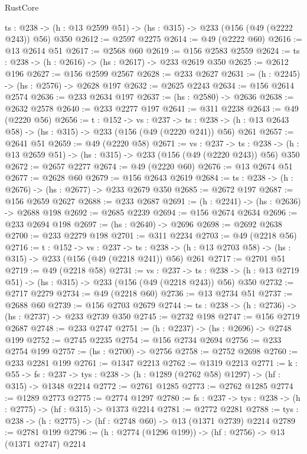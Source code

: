 \begin{lexlean}{RustCore}
\begin{coremodule}
  {ts : @238} -> (h : @13 @2599 @51) -> (hs : @315) -> @233 (@156 (@49 (@2222 @243)) @56) @350
@2612 := @2597 @2275
@2614 := @49 (@2222 @60)
@2616 := @13 @2614 @51
@2617 := @2568 @60
@2619 := @156 @2583 @2559
@2624 := {ts : @238} -> (h : @2616) -> (hs : @2617) -> @233 @2619 @350
@2625 := @2612 @196
@2627 := @156 @2599 @2567
@2628 := @233 @2627
@2631 := (h : @2245) -> (hs : @2576) -> @2628 @197
@2632 := @2625 @2243
@2634 := @156 @2614 @2574
@2636 := @233 @2634 @197
@2637 := (hs : @2580) -> @2636
@2638 := @2632 @2578
@2640 := @233 @2277 @197
@2641 := @311 @2238
@2643 := @49 (@2220 @56)
@2656 := {t : @152} ->
  {vs : @237} ->
  {ts : @238} -> (h : @13 @2643 @58) -> (hs : @315) -> @233 (@156 (@49 (@2220 @241)) @56) @261
@2657 := @2641 @51
@2659 := @49 (@2220 @58)
@2671 := {vs : @237} ->
  {ts : @238} -> (h : @13 @2659 @51) -> (hs : @315) -> @233 (@156 (@49 (@2220 @243)) @56) @350
@2672 := @2657 @2277
@2674 := @49 (@2220 @60)
@2676 := @13 @2674 @51
@2677 := @2628 @60
@2679 := @156 @2643 @2619
@2684 := {ts : @238} -> (h : @2676) -> (hs : @2677) -> @233 @2679 @350
@2685 := @2672 @197
@2687 := @156 @2659 @2627
@2688 := @233 @2687
@2691 := (h : @2241) -> (hs : @2636) -> @2688 @198
@2692 := @2685 @2239
@2694 := @156 @2674 @2634
@2696 := @233 @2694 @198
@2697 := (hs : @2640) -> @2696
@2698 := @2692 @2638
@2700 := @233 @2279 @198
@2701 := @311 @2234
@2703 := @49 (@2218 @56)
@2716 := {t : @152} ->
  {vs : @237} ->
  {ts : @238} -> (h : @13 @2703 @58) -> (hs : @315) -> @233 (@156 (@49 (@2218 @241)) @56) @261
@2717 := @2701 @51
@2719 := @49 (@2218 @58)
@2731 := {vs : @237} ->
  {ts : @238} -> (h : @13 @2719 @51) -> (hs : @315) -> @233 (@156 (@49 (@2218 @243)) @56) @350
@2732 := @2717 @2279
@2734 := @49 (@2218 @60)
@2736 := @13 @2734 @51
@2737 := @2688 @60
@2739 := @156 @2703 @2679
@2744 := {ts : @238} -> (h : @2736) -> (hs : @2737) -> @233 @2739 @350
@2745 := @2732 @198
@2747 := @156 @2719 @2687
@2748 := @233 @2747
@2751 := (h : @2237) -> (hs : @2696) -> @2748 @199
@2752 := @2745 @2235
@2754 := @156 @2734 @2694
@2756 := @233 @2754 @199
@2757 := (hs : @2700) -> @2756
@2758 := @2752 @2698
@2760 := @233 @2281 @199
@2761 := @1347 @2213
@2762 := @1319 @2213
@2771 := {k : @55} ->
  {fs : @237} -> {tys : @238} -> (h : @1289 (@2762 @58) @1297) -> (hf : @315) -> @1348 @2214
@2772 := @2761 @1285
@2773 := @2762 @1285
@2774 := @1289 @2773
@2775 := @2774 @1297
@2780 := {fs : @237} -> {tys : @238} -> (h : @2775) -> (hf : @315) -> @1373 @2214
@2781 := @2772 @2281
@2788 := {tys : @238} -> (h : @2775) -> (hf : @2748 @60) -> @13 (@1371 @2739) @2214
@2789 := @2781 @199
@2796 := (h : @2774 (@1296 @199)) -> (hf : @2756) -> @13 (@1371 @2747) @2214

\end{coremodule}
\end{lexlean}

